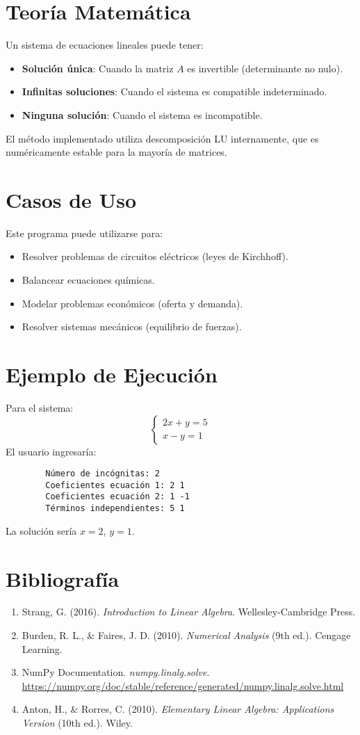 \documentclass{article}
\begin{document}
	\section{Teoría Matemática}
	Un sistema de ecuaciones lineales puede tener:
	\begin{itemize}
		\item \textbf{Solución única}: Cuando la matriz $A$ es invertible (determinante no nulo).
		\item \textbf{Infinitas soluciones}: Cuando el sistema es compatible indeterminado.
		\item \textbf{Ninguna solución}: Cuando el sistema es incompatible.
	\end{itemize}
	
	El método implementado utiliza descomposición LU internamente, que es numéricamente estable para la mayoría de matrices.
	
	\section{Casos de Uso}
	Este programa puede utilizarse para:
	\begin{itemize}
		\item Resolver problemas de circuitos eléctricos (leyes de Kirchhoff).
		\item Balancear ecuaciones químicas.
		\item Modelar problemas económicos (oferta y demanda).
		\item Resolver sistemas mecánicos (equilibrio de fuerzas).
	\end{itemize}
	
	\section{Ejemplo de Ejecución}
	Para el sistema:
	\[
	\begin{cases}
		2x + y = 5 \\
		x - y = 1
	\end{cases}
	\]
	El usuario ingresaría:
	\begin{verbatim}
		Número de incógnitas: 2
		Coeficientes ecuación 1: 2 1
		Coeficientes ecuación 2: 1 -1
		Términos independientes: 5 1
	\end{verbatim}
	La solución sería $x = 2$, $y = 1$.
	
	\section{Bibliografía}
	\begin{enumerate}
		\item Strang, G. (2016). \textit{Introduction to Linear Algebra}. Wellesley-Cambridge Press.
		\item Burden, R. L., \& Faires, J. D. (2010). \textit{Numerical Analysis} (9th ed.). Cengage Learning.
		\item NumPy Documentation. \textit{numpy.linalg.solve}. \url{https://numpy.org/doc/stable/reference/generated/numpy.linalg.solve.html}
		\item Anton, H., \& Rorres, C. (2010). \textit{Elementary Linear Algebra: Applications Version} (10th ed.). Wiley.
	\end{enumerate}
	
\end{document}
